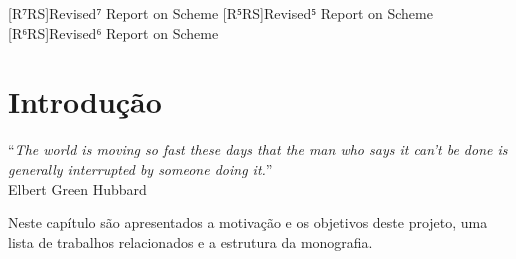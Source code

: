 \documentclass[brazil,pagestart=firstchapter]{abnt}
\begin{document}


\begin{acronym}[EEPROM]

[R⁷RS]{Revised⁷ Report on Scheme}
[R⁵RS]{Revised⁵ Report on Scheme}
[R⁶RS]{Revised⁶ Report on Scheme}



\end{acronym}


\tableofcontents





\chapter{Introdução}
\label{cap:introducao}


\vfill{}
\begin{flushright}{}
``\emph{The world is moving so fast these days that the man who says it
can't be done is generally interrupted by someone doing it.}''\\
{\small Elbert Green Hubbard}
\end{flushright}{\small \par}
\vfill{}

Neste capítulo são apresentados a motivação e os objetivos deste projeto, uma
lista de trabalhos relacionados e a estrutura da monografia.
\newpage
\end{document}
